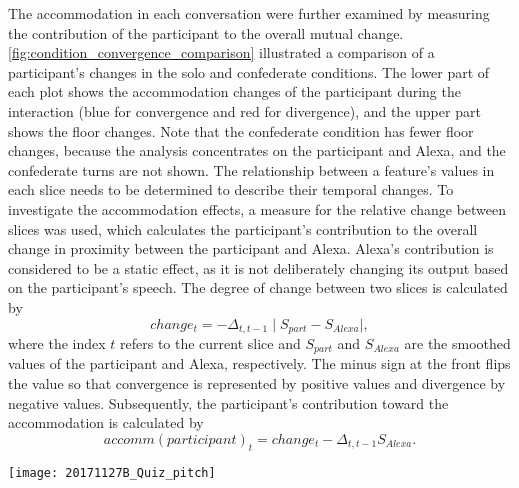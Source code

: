 The accommodation in each conversation were further examined by measuring the contribution of the participant to the overall mutual change.
\cref{fig:condition_convergence_comparison} illustrated a comparison of a participant's changes in the solo and confederate conditions.
The lower part of each plot shows the accommodation changes of the participant during the interaction (blue for convergence and red for divergence), and the upper part shows the floor changes.
Note that the confederate condition has fewer floor changes, because the analysis concentrates on the participant and Alexa, and the confederate turns are not shown.
The relationship between a feature's values in each slice needs to be determined to describe their temporal changes.
To investigate the accommodation effects, a measure for the relative change between slices was used, which calculates the participant's contribution to the overall change in proximity between the participant and Alexa.
Alexa's contribution is considered to be a static effect, as it is not deliberately changing its output based on the participant's speech.%
The degree of change between two slices is calculated by
%
\begin{equation}
	\label{eq:change}
	change_t = -\Delta_{t, t-1} \mid S_{part} - S_{Alexa} \mid,
\end{equation}
\noindent
%
where the index $t$ refers to the current slice and $S_{part}$ and $S_{Alexa}$ are the smoothed values of the participant and Alexa, respectively.
The minus sign at the front flips the value so that convergence is represented by positive values and divergence by negative values.
Subsequently, the participant's contribution toward the accommodation is calculated by
%
\begin{equation}
	\label{eq:accommodation}
	accomm(participant)_t = change_t - \Delta_{t, t-1} S_{Alexa}.
\end{equation}
\noindent
%
%
\begin{figure*}[t]
	\centering
	\texttt{[image: 20171127B\_Quiz\_pitch]}
	\caption[Temporal comparison of accommodation in solo and confederate conditions]
		{A comparison between \ac{f0} changes in solo (left) and confederate (right) conditions.
		The horizontal lines show the smoothed trends of the participant (blue) and Alexa (red).
		Confederate turns and omitted segments (as per \cref{subsec:annotations_hhci}), are not colored (gray).
		The vertical bars in the upper halves represent the turns of the participant (blue) and Alexa (red).
		The color-scaled vertical bars at the bottom halves show the convergence (blue) or divergence (red) level of the participant as calculated by \cref{eq:accommodation}.
		The darker the color, the greater the effect, with white indicating no change (or synchrony, in segments with both trends moving the same way).}
	\label{fig:condition_convergence_comparison}
\end{figure*}

